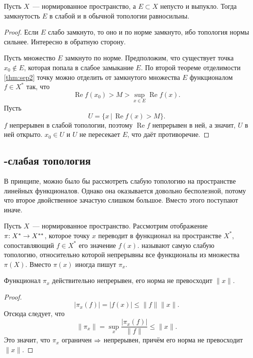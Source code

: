 \documentclass{notes}
\DeclareMathOperator{\re}{Re}
\newcommand{\ta}{$*$}
\begin{document}
	\begin{thm}[Мазура] \label{thm:mas}
		Пусть $X$~--- нормированное пространство, а $E \subset X$ непусто и выпукло. Тогда замкнутость $E$ в слабой и в обычной топологии равносильны.
		\begin{proof}
			Если $E$ слабо замкнуто, то оно и по норме замкнуто, ибо топология нормы сильнее. Интересно в обратную сторону.

			Пусть множество $E$ замкнуто по норме. Предположим, что существует точка $x_0 \notin E$, которая попала в слабое замыкание $E$. По второй теореме отделимости \ref{thm:sep2} точку можно отделить от замкнутого множества $E$ функционалом $f \in X^{*}$ так, что 
			\[
				\re f(x_0) > M > \sup\limits_{x \in E} \re f(x).
			\]
			Пусть 
			\[
				U = \{x \, | \, \re f(x) > M\}.
			\]
			$f$ непрерывен в слабой топологии, поэтому $\re f$ непрерывен в ней, а значит, $U$ в ней открыто. $x_0 \in U$ и $U$ не пересекает $E$, что даёт противоречие.
		\end{proof}
	\end{thm}

\subsection{\textasteriskcentered-слабая топология}

	В принципе, можно было бы рассмотреть слабую топологию на пространстве линейных функционалов. Однако она оказывается довольно бесполезной, потому что второе двойственное зачастую слишком большое. Вместо этого поступают иначе.

	\begin{de}
		Пусть $X$~--- нормированное пространство. Рассмотрим отображение $\pi\text{\text{:}} \; X^* \to X^{**}$, которое точку $x$ переводит в функционал на пространстве $X^{*}$, сопоставляющий $f \in X^{*}$ его значение $f(x)$. \ti{\ta-слабой топологией} называют самую слабую топологию, относительно которой непрерывны все функционалы из множества $\pi(X)$.
		Вместо $\pi(x)$ иногда пишут $\pi_x$.
	\end{de}

	\begin{st}[Корректность]
		\label{st:cor-sweak}
		Функционал $\pi_x$ действительно непрерывен, его норма не превосходит $\|x\|$.
		\begin{proof}
			\[
				\big|\pi_x(f)\big| = \big|f(x)\big| \leqslant \|f\| \|x\|.
			\]
			Отсюда следует, что
			\[
				\|\pi_x\| = \sup\limits_x \dfrac{\big|\pi_x(f)\big|}{\|f\|} \leqslant \|x\|.
			\]
			Это значит, что $\pi_x$ ограничен $\Rightarrow$ непрерывен, причём его норма не превосходит $\|x\|$.
		\end{proof}
	\end{st}
\end{document}
